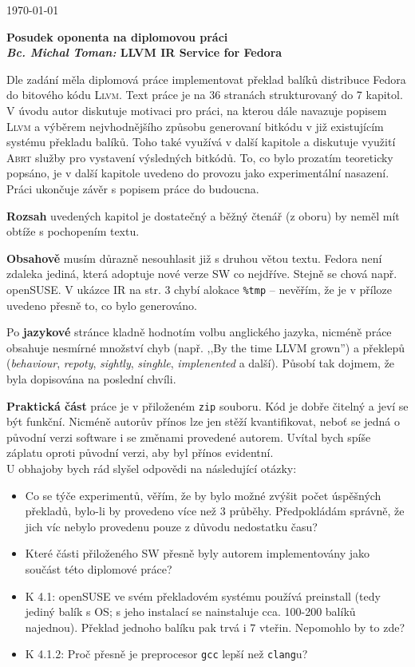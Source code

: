 \documentclass{article}
\begin{document}
\begin{flushright}
\today
\end{flushright}
\begin{center}
\Large\textbf{Posudek oponenta na diplomovou práci \\
\normalsize%
\textit{Bc. Michal Toman:} LLVM IR Service for Fedora}
\end{center}

Dle zadání měla diplomová práce implementovat překlad balíků distribuce Fedora
do bitového kódu \textsc{Llvm}. Text práce je na 36 stranách strukturovaný do
7 kapitol. V úvodu autor diskutuje motivaci pro práci, na kterou dále navazuje
popisem \textsc{Llvm} a výběrem nejvhodnějšího způsobu generovaní bitkódu v
již existujícím systému překladu balíků. Toho také využívá v další kapitole a
diskutuje využití \textsc{Abrt} služby pro vystavení výsledných bitkódů. To,
co bylo prozatím teoreticky popsáno, je v další kapitole uvedeno do provozu
jako experimentální nasazení. Práci ukončuje závěr s popisem práce do
budoucna.

\textbf{Rozsah} uvedených kapitol je dostatečný a běžný čtenář (z oboru) by
neměl mít obtíže s pochopením textu.

\textbf{Obsahově} musím důrazně nesouhlasit již s druhou větou textu. Fedora
není zdaleka jediná, která adoptuje nové verze SW co nejdříve. Stejně se chová
např. openSUSE. V ukázce IR na str. 3 chybí alokace \texttt{\%tmp} -- nevěřím,
že je v příloze uvedeno přesně to, co bylo generováno.

Po \textbf{jazykové} stránce kladně hodnotím volbu anglického jazyka, nicméně
práce obsahuje nesmírné množství chyb (např. ,,By the time LLVM grown'') a
překlepů (\emph{behaviour}, \emph{repoty}, \emph{sightly}, \emph{singhle},
\emph{implenented} a další).  Působí tak dojmem, že byla dopisována na
poslední chvíli.

\textbf{Praktická část} práce je v přiloženém \texttt{zip} souboru. Kód je
dobře čitelný a jeví se být funkční. Nicméně autorův přínos lze jen stěží
kvantifikovat, neboť se jedná o původní verzi software i se změnami provedené
autorem. Uvítal bych spíše záplatu oproti původní verzi, aby byl přínos
evidentní.
\\[1em]
U obhajoby bych rád slyšel odpovědi na následující otázky:
\begin{itemize}
\item Co se týče experimentů, věřím, že by bylo možné zvýšit počet úspěšných
překladů, bylo-li by provedeno více než 3 průběhy. Předpokládám správně, že
jich víc nebylo provedenu pouze z důvodu nedostatku času?
\item Které části přiloženého SW přesně byly autorem implementovány jako
součást této diplomové práce?
\item K 4.1: openSUSE ve svém překladovém systému používá preinstall (tedy
jediný balík s OS; s jeho instalací se nainstaluje cca. 100-200 balíků
najednou). Překlad jednoho balíku pak trvá i 7 vteřin. Nepomohlo by to zde?
\item K 4.1.2: Proč přesně je preprocesor \texttt{gcc} lepší než
\texttt{clang}u?
\end{itemize}
\end{document}
